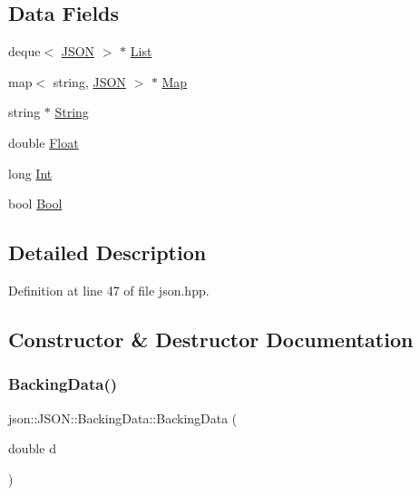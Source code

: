 \subsection*{Data Fields}
\begin{DoxyCompactItemize}
\item 
deque$<$ \mbox{\hyperlink{classjson_1_1_j_s_o_n}{J\+S\+ON}} $>$ $\ast$ \mbox{\hyperlink{unionjson_1_1_j_s_o_n_1_1_backing_data_ab85f5e7ad21f9f7a5407ab73128a3ebc}{List}}
\item 
map$<$ string, \mbox{\hyperlink{classjson_1_1_j_s_o_n}{J\+S\+ON}} $>$ $\ast$ \mbox{\hyperlink{unionjson_1_1_j_s_o_n_1_1_backing_data_ab2e19b00745b37d2add157ff3a35c431}{Map}}
\item 
string $\ast$ \mbox{\hyperlink{unionjson_1_1_j_s_o_n_1_1_backing_data_a883c18d113d2e55767a9530f06a9c772}{String}}
\item 
double \mbox{\hyperlink{unionjson_1_1_j_s_o_n_1_1_backing_data_aac4950afa6b9205bb367a33de47faa5c}{Float}}
\item 
long \mbox{\hyperlink{unionjson_1_1_j_s_o_n_1_1_backing_data_a0d80815a70ff5bb9345f75de79ec81c3}{Int}}
\item 
bool \mbox{\hyperlink{unionjson_1_1_j_s_o_n_1_1_backing_data_a0659fafaedb7de535ae3e79e4ff4688c}{Bool}}
\end{DoxyCompactItemize}


\subsection{Detailed Description}


Definition at line 47 of file json.\+hpp.



\subsection{Constructor \& Destructor Documentation}
\mbox{\label{unionjson_1_1_j_s_o_n_1_1_backing_data_a7d9921b5b250d942ceb1b2e11a8b9b8b}} 
\subsubsection{\texorpdfstring{Backing\+Data()}{BackingData()}\hspace{0.1cm}{\footnotesize\ttfamily [1/5]}}
{\footnotesize\ttfamily json\+::\+J\+S\+O\+N\+::\+Backing\+Data\+::\+Backing\+Data (\begin{DoxyParamCaption}\item[{double}]{d }\end{DoxyParamCaption})\hspace{0.3cm}{\ttfamily [inline]}}



